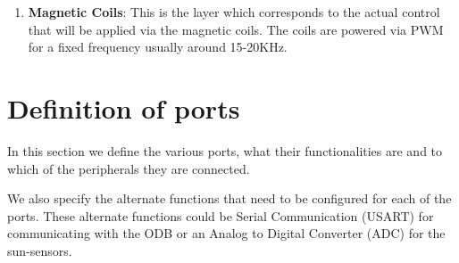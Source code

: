 \documentclass[11pt,a4paper]{report}
\begin{document}
\begin{enumerate}
\item 
\textbf{Magnetic Coils}: This is the layer which corresponds to the actual control that will be applied via the magnetic coils. The coils are powered via PWM for a fixed frequency usually around 15-20KHz. 
\end{enumerate}


\section{Definition of ports}

In this section we define the various ports, what their functionalities are and to which of the peripherals they are connected. 

We also specify the alternate functions that need to be configured for each of the ports. These alternate functions could be Serial Communication (USART) for communicating with the ODB or an Analog to Digital Converter (ADC) for the sun-sensors. 
\end{document}
